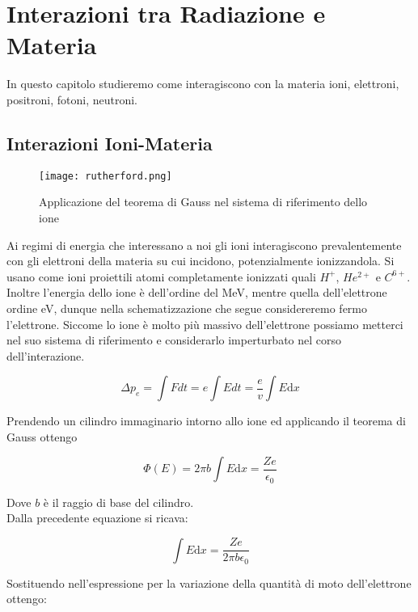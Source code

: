 \documentclass [a4paper, twoside] {book}
\begin{document}
\chapter{Interazioni tra Radiazione e Materia}

In questo capitolo studieremo come interagiscono con la materia ioni, elettroni, positroni, fotoni, neutroni.

\section{Interazioni Ioni-Materia}

\begin{figure}[]
\centering
	\texttt{[image: rutherford.png]}
	\caption{Applicazione del teorema di Gauss nel sistema di riferimento dello ione}
	\label{fig:rutherford}
\end{figure}


Ai regimi di energia che interessano a noi gli ioni interagiscono prevalentemente con gli elettroni della materia su cui incidono, potenzialmente ionizzandola. Si usano come ioni proiettili atomi completamente ionizzati quali $H^+$, $He^{2+}$ e $C^{6+}$.
Inoltre l'energia dello ione è dell'ordine del MeV, mentre quella dell'elettrone ordine eV, dunque nella schematizzazione che segue considereremo fermo l'elettrone.
Siccome lo ione è molto più massivo dell'elettrone possiamo metterci nel suo sistema di riferimento e considerarlo imperturbato nel corso dell'interazione. 

\begin{equation}
\Delta p_e=\int Fdt = e\int Edt = \frac {e}{v}\int E \mathrm{d}x
\end{equation}

Prendendo un cilindro immaginario intorno allo ione ed applicando il teorema di Gauss ottengo

\begin{equation}
\Phi(E)=2\pi b \int E \mathrm{d}x =\frac{Ze}{\epsilon_0}
\end{equation}

Dove $b$ è il raggio di base del cilindro.\\
Dalla precedente equazione si ricava:

\begin{equation}
\int E \mathrm{d}x= \frac{Ze}{2\pi b \epsilon_0}
\end{equation}

Sostituendo nell'espressione per la variazione della quantità di moto dell'elettrone ottengo:
\end{document}
